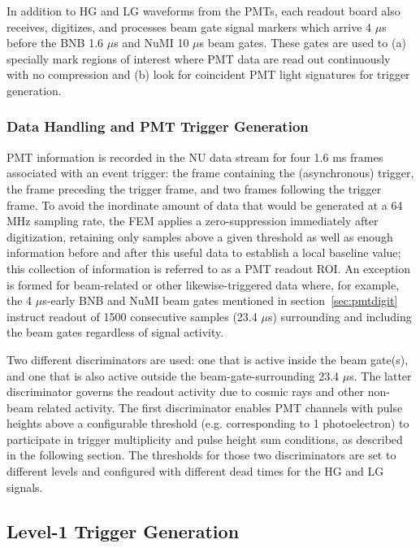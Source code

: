 In addition to HG and LG waveforms from the PMTs, each readout board also receives, digitizes, and processes beam gate signal markers which arrive 4 $\mu$s before the BNB 1.6 $\mu$s and NuMI 10 $\mu$s beam gates. These gates are used to (a) specially mark regions of interest where PMT data are read out continuously with no compression and (b) look for coincident PMT light signatures for trigger generation. 

\subsubsection{Data Handling and PMT Trigger Generation}
\label{tpcfem}

PMT information is recorded in the NU data stream for four 1.6 ms frames associated with an event trigger: the frame containing the (asynchronous) trigger, the frame preceding the trigger frame, and two frames following the trigger frame. To avoid the inordinate amount of data that would be generated at a 64 MHz sampling rate, the FEM applies a zero-suppression immediately after digitization, retaining only samples above a given threshold as well as enough information before and after this useful data to establish a local baseline value; this collection of information is referred to as a PMT readout ROI. An exception is formed for beam-related or other likewise-triggered data where, for example,  the 4 $\mu$s-early BNB and NuMI beam gates mentioned in section~\ref{sec:pmtdigit} instruct readout of 1500 consecutive samples (23.4 $\mu$s) surrounding and including the beam gates regardless of signal activity.

Two different discriminators are used: one that is active inside the beam gate(s), and one that is also active outside the beam-gate-surrounding 23.4 $\mu$s. The latter discriminator governs the readout activity due to cosmic rays and other non-beam related activity. The first discriminator enables PMT channels with pulse heights above a configurable threshold (e.g. corresponding to 1 photoelectron)  to participate in trigger multiplicity and pulse height sum conditions, as described in the following section. The thresholds for those two discriminators are set to different levels and configured with different dead times for the HG and LG signals.

\subsection{Level-1 Trigger Generation}
\label{sec:trigger}

